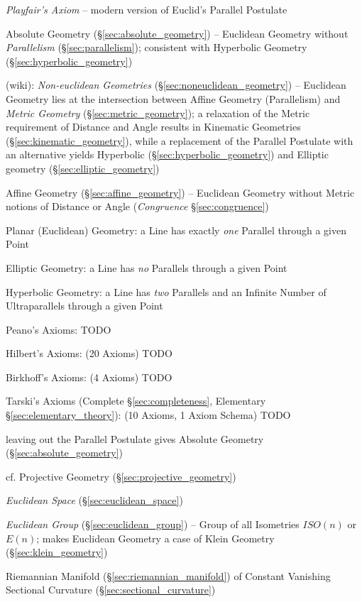 \emph{Playfair's Axiom} -- modern version of Euclid's Parallel Postulate

Absolute Geometry (\S\ref{sec:absolute_geometry}) -- Euclidean Geometry
without \emph{Parallelism} (\S\ref{sec:parallelism}); consistent with Hyperbolic
Geometry (\S\ref{sec:hyperbolic_geometry})

(wiki): \emph{Non-euclidean Geometries} (\S\ref{sec:noneuclidean_geometry}) --
Euclidean Geometry lies at the intersection between Affine Geometry
(Parallelism) and \emph{Metric Geometry} (\S\ref{sec:metric_geometry}); a
relaxation of the Metric requirement of Distance and Angle results in Kinematic
Geometries (\S\ref{sec:kinematic_geometry}), while a replacement of the Parallel
Postulate with an alternative yields Hyperbolic
(\S\ref{sec:hyperbolic_geometry}) and Elliptic geometry
(\S\ref{sec:elliptic_geometry})

Affine Geometry (\S\ref{sec:affine_geometry}) -- Euclidean Geometry without
Metric notions of Distance or Angle (\emph{Congruence} \S\ref{sec:congruence})

Planar (Euclidean) Geometry: a Line has exactly \emph{one} Parallel through a
given Point

\fist Elliptic Geometry: a Line has \emph{no} Parallels through a given Point

\fist Hyperbolic Geometry: a Line has \emph{two} Parallels and an Infinite
Number of Ultraparallels through a given Point

Peano's Axioms: TODO

Hilbert's Axioms: (20 Axioms) TODO

Birkhoff's Axioms: (4 Axioms) TODO

Tarski's Axioms (Complete \S\ref{sec:completeness}, Elementary
\S\ref{sec:elementary_theory}): (10 Axioms, 1 Axiom Schema) TODO

\fist leaving out the Parallel Postulate gives Absolute Geometry
(\S\ref{sec:absolute_geometry})

cf. Projective Geometry (\S\ref{sec:projective_geometry})

\emph{Euclidean Space} (\S\ref{sec:euclidean_space})

\emph{Euclidean Group} (\S\ref{sec:euclidean_group}) -- Group of all
Isometries $ISO(n)$ or $E(n)$; makes Euclidean Geometry a case of
Klein Geometry (\S\ref{sec:klein_geometry})

Riemannian Manifold (\S\ref{sec:riemannian_manifold}) of Constant Vanishing
Sectional Curvature (\S\ref{sec:sectional_curvature})

